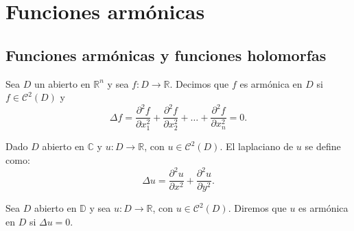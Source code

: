 \chapter{Funciones armónicas}

\section{Funciones armónicas y funciones holomorfas}
\begin{definition}
    Sea $D$ un abierto en $\mathbb{R}^n$ y sea $f: D \to \mathbb{R}$.
    Decimos que $f$ es armónica en $D$ si $f \in \mathcal{C}^2(D)$ y
    $$\Delta f = \frac{\partial^2f}{\partial x_1^2} + \frac{\partial^2f}{\partial x_2^2} + \dots + \frac{\partial^2f}{\partial x_n^2} = 0.$$
\end{definition}

\begin{definition}
    Dado $D$ abierto en $\mathbb{C}$ y $u: D \to \mathbb{R}$, con $u \in \mathcal{C}^2(D)$.
    El laplaciano de $u$ se define como:
    $$\Delta u = \frac{\partial^2u}{\partial x^2} + \frac{\partial^2u}{\partial y^2}.$$
\end{definition}

\begin{definition}
    Sea $D$ abierto en $\mathbb{D}$ y sea $u: D \to \mathbb{R}$, con $u \in \mathcal{C}^2(D)$.
    Diremos que $u$ es armónica en $D$ si $\Delta u = 0$.
\end{definition}

